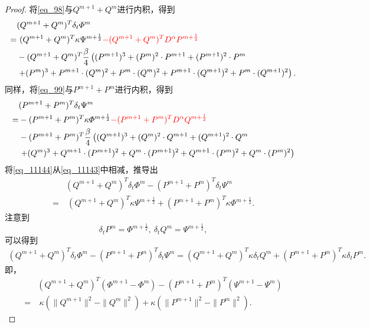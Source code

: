 \begin{proof}
将\eqref{eq_98}与$Q^{m+1}+Q^{m}$进行内积，得到
\begin{align}
&(Q^{m+1}+Q^{m})^{T}\delta_{t} \varPhi^{m}\nonumber\\
=&~(Q^{m+1}+Q^{m})^{T}\kappa \Psi^{m+\frac{1}{2}}\textcolor[rgb]{1.00,0.00,0.00}{-(Q^{m+1}+Q^{m})^{T}D^{\alpha} P^{m+\frac{1}{2}}}\nonumber\\
&-(Q^{m+1}+Q^{m})^{T}\frac{\beta}{4}\left((P^{m+1})^3+(P^{m})^{2}\cdot P^{m+1}+(P^{m+1})^{2}\cdot P^{m}\right.\nonumber\\
&\left.+(P^{m})^{3}+P^{m+1}\cdot (Q^{m})^{2}+P^{m}\cdot (Q^{m})^{2}+P^{m+1}\cdot (Q^{m+1})^{2}+P^{m}\cdot (Q^{m+1})^{2}\right).\label{eq_11143}
\end{align}
同样，将\eqref{eq_99}与$P^{m+1}+P^{m}$进行内积，得到
\begin{align}
&(P^{m+1}+P^{m})^{T}\delta_{t} \Psi^{m}\nonumber\\
=&-(P^{m+1}+P^{m})^{T}\kappa \varPhi^{m+\frac{1}{2}}\textcolor[rgb]{1.00,0.00,0.00}{-(P^{m+1}+P^{m})^{T}D^{\alpha} Q^{m+\frac{1}{2}}}\nonumber\\
&-(P^{m+1}+P^{m})^{T}\frac{\beta}{4}\left((Q^{m+1})^3+(Q^{m})^{2}\cdot Q^{m+1}+(Q^{m+1})^{2}\cdot Q^{m}\right.\nonumber\\
&\left.+(Q^{m})^{3}+Q^{m+1}\cdot (P^{m+1})^{2}+Q^{m}\cdot (P^{m+1})^{2}+Q^{m+1}\cdot (P^{m})^{2}+Q^{m}\cdot (P^{m})^{2}\right)\label{eq_11144}
\end{align}
将\eqref{eq_11144}从\eqref{eq_11143}中相减，推导出
\begin{align}
&(Q^{m+1}+Q^{m})^{T}\delta_{t} \varPhi^{m}-(P^{m+1}+P^{m})^{T}\delta_{t} \Psi^{m}\nonumber\\
=&~(Q^{m+1}+Q^{m})^{T}\kappa \Psi^{m+\frac{1}{2}}+(P^{m+1}+P^{m})^{T}\kappa \varPhi^{m+\frac{1}{2}}.\label{eq_11145}
\end{align}
注意到
$$\delta_t P^m=\varPhi^{m+\frac{1}{2}},~\delta_t Q^m=\Psi^{m+\frac{1}{2}},$$
可以得到
\begin{align}\label{eq_11146}
(Q^{m+1}+Q^{m})^{T}\delta_{t} \varPhi^{m}\!-\!(P^{m+1}+P^{m})^{T}\delta_{t} \Psi^{m}=(Q^{m+1}+Q^{m})^{T}\kappa \delta_t Q^m+(P^{m+1}+P^{m})^{T}\kappa \delta_t P^m.
\end{align}
即，
\begin{align}
&(Q^{m+1}+Q^{m})^{T}(\varPhi^{m+1}-\varPhi^{m})-(P^{m+1}+P^{m})^{T}(\Psi^{m+1}-\Psi^{m})\nonumber\\
=&~\kappa (\|Q^{m+1}\|^2-\|Q^{m}\|^2)+\kappa (\|P^{m+1}\|^2-\|P^{m}\|^2).\label{eq_11147}

\end{align}
\end{proof}
